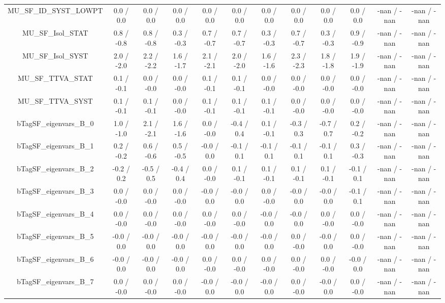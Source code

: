\begin{table}[htbp]
\begin{center}
\begin{tabular}{|c|c|c|c|c|c|c|c|c|c|c|c|}
  MU_SF_ID_SYST_LOWPT & 0.0 / 0.0 & 0.0 / 0.0 & 0.0 / 0.0 & 0.0 / 0.0 & 0.0 / 0.0 & 0.0 / 0.0 & 0.0 / 0.0 & 0.0 / 0.0 & 0.0 / 0.0 & -nan / -nan & -nan / -nan \\ 
  MU_SF_Isol_STAT & 0.8 / -0.8 & 0.8 / -0.8 & 0.3 / -0.3 & 0.7 / -0.7 & 0.7 / -0.7 & 0.3 / -0.3 & 0.7 / -0.7 & 0.3 / -0.3 & 0.9 / -0.9 & -nan / -nan & -nan / -nan \\ 
  MU_SF_Isol_SYST & 2.0 / -2.0 & 2.2 / -2.2 & 1.6 / -1.7 & 2.1 / -2.1 & 2.0 / -2.0 & 1.6 / -1.6 & 2.3 / -2.3 & 1.8 / -1.8 & 1.9 / -1.9 & -nan / -nan & -nan / -nan \\ 
  MU_SF_TTVA_STAT & 0.1 / -0.1 & 0.0 / -0.0 & 0.0 / -0.0 & 0.1 / -0.1 & 0.1 / -0.1 & 0.0 / -0.0 & 0.0 / -0.0 & 0.0 / -0.0 & 0.0 / -0.0 & -nan / -nan & -nan / -nan \\ 
  MU_SF_TTVA_SYST & 0.1 / -0.1 & 0.1 / -0.1 & 0.0 / -0.0 & 0.1 / -0.1 & 0.1 / -0.1 & 0.1 / -0.1 & 0.0 / -0.0 & 0.0 / -0.0 & 0.0 / -0.0 & -nan / -nan & -nan / -nan \\ 
  bTagSF_eigenvars_B_0 & 1.0 / -1.0 & 2.1 / -2.1 & 1.6 / -1.6 & 0.0 / -0.0 & -0.4 / 0.4 & 0.1 / -0.1 & -0.3 / 0.3 & -0.7 / 0.7 & 0.2 / -0.2 & -nan / -nan & -nan / -nan \\ 
  bTagSF_eigenvars_B_1 & 0.2 / -0.2 & 0.6 / -0.6 & 0.5 / -0.5 & -0.0 / 0.0 & -0.1 / 0.1 & -0.1 / 0.1 & -0.1 / 0.1 & -0.1 / 0.1 & 0.3 / -0.3 & -nan / -nan & -nan / -nan \\ 
  bTagSF_eigenvars_B_2 & -0.2 / 0.2 & -0.5 / 0.5 & -0.4 / 0.4 & 0.0 / -0.0 & 0.1 / -0.1 & 0.1 / -0.1 & 0.1 / -0.1 & 0.1 / -0.1 & -0.1 / 0.1 & -nan / -nan & -nan / -nan \\ 
  bTagSF_eigenvars_B_3 & 0.0 / -0.0 & 0.0 / -0.0 & 0.0 / -0.0 & -0.0 / 0.0 & -0.0 / 0.0 & 0.0 / -0.0 & -0.0 / 0.0 & -0.0 / 0.0 & -0.1 / 0.1 & -nan / -nan & -nan / -nan \\ 
  bTagSF_eigenvars_B_4 & 0.0 / -0.0 & 0.0 / -0.0 & 0.0 / -0.0 & 0.0 / -0.0 & 0.0 / -0.0 & -0.0 / 0.0 & -0.0 / 0.0 & 0.0 / -0.0 & 0.0 / -0.0 & -nan / -nan & -nan / -nan \\ 
  bTagSF_eigenvars_B_5 & -0.0 / 0.0 & -0.0 / 0.0 & -0.0 / 0.0 & -0.0 / 0.0 & -0.0 / 0.0 & -0.0 / 0.0 & 0.0 / -0.0 & -0.0 / 0.0 & 0.0 / -0.0 & -nan / -nan & -nan / -nan \\ 
  bTagSF_eigenvars_B_6 & -0.0 / 0.0 & -0.0 / 0.0 & -0.0 / 0.0 & 0.0 / -0.0 & 0.0 / -0.0 & 0.0 / -0.0 & 0.0 / -0.0 & 0.0 / -0.0 & -0.0 / 0.0 & -nan / -nan & -nan / -nan \\ 
  bTagSF_eigenvars_B_7 & 0.0 / -0.0 & 0.0 / -0.0 & 0.0 / -0.0 & -0.0 / 0.0 & -0.0 / 0.0 & -0.0 / 0.0 & 0.0 / -0.0 & -0.0 / 0.0 & 0.0 / -0.0 & -nan / -nan & -nan / -nan \\ 

\end{tabular}
\end{center}
\end{table}

